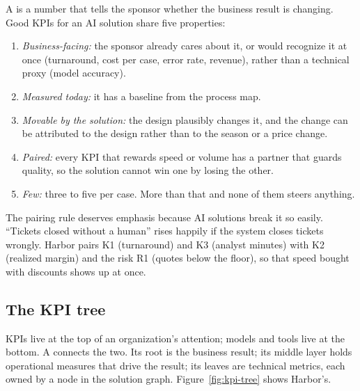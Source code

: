 A  is a number that tells the sponsor whether the business result is changing. Good KPIs for an AI solution share five properties:
\begin{enumerate}[itemsep=1pt]
  \item \emph{Business-facing:} the sponsor already cares about it, or would recognize it at once (turnaround, cost per case, error rate, revenue), rather than a technical proxy (model accuracy).
  \item \emph{Measured today:} it has a baseline from the process map.
  \item \emph{Movable by the solution:} the design plausibly changes it, and the change can be attributed to the design rather than to the season or a price change.
  \item \emph{Paired:} every KPI that rewards speed or volume has a partner that guards quality, so the solution cannot win one by losing the other.
  \item \emph{Few:} three to five per case. More than that and none of them steers anything.
\end{enumerate}

The pairing rule deserves emphasis because AI solutions break it so easily. ``Tickets closed without a human'' rises happily if the system closes tickets wrongly. Harbor pairs \textsf{K1} (turnaround) and \textsf{K3} (analyst minutes) with \textsf{K2} (realized margin) and the risk \textsf{R1} (quotes below the floor), so that speed bought with discounts shows up at once.

\subsection{The KPI tree}

KPIs live at the top of an organization's attention; models and tools live at the bottom. A  connects the two. Its root is the business result; its middle layer holds operational measures that drive the result; its leaves are technical metrics, each owned by a node in the solution graph. Figure~\ref{fig:kpi-tree} shows Harbor's.


